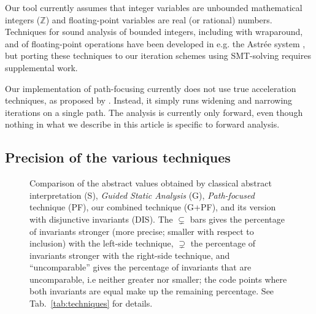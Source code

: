 \documentclass[preprint]{sigplanconf}
\newcommand{\ZZ}{\mathbb{Z}}
\begin{document}
Our tool currently assumes that integer variables are unbounded mathematical integers ($\ZZ$) and floating-point variables are real (or rational) numbers. Techniques for sound analysis of bounded integers, including with wraparound, and of floating-point operations have been developed in e.g. the Astr\'ee system \citep{ASTREE_ESOP05,ASTREE_PLDI03}, but porting these techniques to our iteration schemes using SMT-solving requires supplemental work.

Our implementation of path-focusing currently does not use true acceleration techniques, as proposed by \citet{Monniaux_Gonnord_SAS11}. Instead, it simply runs widening and narrowing iterations on a single path.
The analysis is currently only forward, even though nothing in what we describe in this article is specific to forward analysis.

\subsection{Precision of the various techniques}
\label{sec:compare_techniques}

\begin{figure}[h]
  \begin{center}
    
  \end{center} 
  \vspace{-20px}
  \caption{Comparison of the abstract values obtained by classical abstract
  interpretation (S), \emph{Guided Static
  Analysis} (G), \emph{Path-focused} technique (PF), our combined technique
  (G+PF), and its version with disjunctive invariants (DIS).
  The $\subsetneq$ bars gives the percentage of invariants stronger (more precise; smaller with respect to inclusion) with the left-side technique,
$\supsetneq$ the percentage of invariants stronger with the right-side technique,
and ``uncomparable'' gives the percentage of invariants that are uncomparable, i.e
neither greater nor smaller;
the code points where both invariants are equal make up the remaining percentage. See Tab.~\ref{tab:techniques} for details.}
  \label{fig:techniques}
\end {figure}
\end{document}
